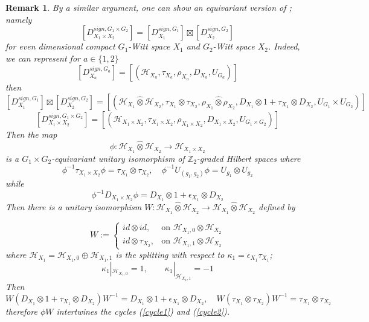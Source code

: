 \documentclass[11pt,leqno,twoside]{amsart}
\theoremstyle{plainsl}
\newtheorem{remark}[theorem]{Remark}
\theoremstyle{definition}
\begin{document}
\begin{remark}\label{anotherproofofcaretstionKhomology}
By a similar argument, one can show an equivariant version of \cite[Corollary 5.18]{ABP1}; namely
\begin{equation}\label{equivaintabp1result}
    [D^{sign, G_1\times G_2}_{X_1\times X_2}]=[D^{sign, G_1}_{X_1}] \boxtimes [D^{sign, G_2}_{X_2}]
\end{equation}
for even dimensional compact $G_1$-Witt space $X_1$ and $G_2$-Witt space $X_2$.  Indeed, we can represent for $a\in \{1,2\}$
\[[D^{sign, G_a}_{X_a}]=\left[(\mathcal{H}_{X_a},\tau_{X_a},\rho_{X_a},D_{X_a},{U}_{G_a})\right]\]
then
\begin{equation}\label{cycle1}
   [D^{sign, G_1}_{X_1}] \boxtimes [D^{sign, G_2}_{X_2}]=\left[(\mathcal{H}_{X_1}\widehat{\otimes} \mathcal{H}_{X_2},\tau_{X_1}\otimes \tau_{X_2},\rho_{X_1} \widehat{\otimes}\rho_{X_2},D_{X_1}\otimes 1+ \tau_{X_1}\otimes D_{X_2} ,{U}_{G_1}\times {U}_{G_2})\right] 
\end{equation}
\begin{equation}\label{cycle2}
    [D^{sign, G_1\times G_2}_{X_1\times X_2}]=\left[(\mathcal{H}_{X_1\times X_2},\tau_{X_1\times X_2},\rho_{X_1\times X_2},D_{X_1\times X_2},  {U}_{G_1\times G_2})    \right]
\end{equation}
Then the map 
\[\phi:\mathcal{H}_{X_1}\widehat{\otimes} \mathcal{H}_{X_2} \rightarrow \mathcal{H}_{X_1\times X_2}\]
is a $G_1\times G_2$-\textit{equivariant} unitary isomorphism of  \(\mathbb Z_2\)-graded Hilbert spaces where
\[
\phi^{-1}\tau_{X_1\times X_2}\phi=\tau_{X_1}\otimes\tau_{X_2}, \quad 
\phi^{-1}U_{(g_1,g_2)}\phi=U_{g_1}\otimes U_{g_2}
\]
while
\[\phi^{-1}D_{X_1\times X_2}\phi=D_{X_1}\otimes1+\epsilon_{X_1}\otimes D_{X_2}\]
Then  there is a unitary isomorphism  $W:\mathcal{H}_{X_1}\widehat{\otimes} \mathcal{H}_{X_2} \rightarrow \mathcal{H}_{X_1}\widehat{\otimes} \mathcal{H}_{X_2}$ defined by



\[
W:=
\begin{cases}
id\otimes id,&\text{on }\mathcal H_{X_1,0}\otimes\mathcal H_{X_2}\\
id\otimes\tau_{X_2},&\text{on }\mathcal H_{X_1,1}\otimes\mathcal H_{X_2}
\end{cases}
\]
where $\mathcal H_{X_1}=\mathcal H_{X_1,0}\oplus\mathcal H_{X_1,1}$ is the splitting with respect to $\kappa_1=\epsilon_{X_1}\tau_{X_1}$; $$\kappa_1|_{\mathcal H_{X_1,0}}=1, \qquad
\kappa_1|_{\mathcal H_{X_1,1}}=-1$$ Then
\[W(D_{X_1}\otimes 1+ \tau_{X_1}\otimes D_{X_2})W^{-1}=D_{X_1}\otimes1+\epsilon_{X_1}\otimes D_{X_2},\quad W(\tau_{X_1}\otimes \tau_{X_2})W^{-1}=\tau_{X_1}\otimes \tau_{X_2}\]
therefore $\phi W$ intertwines the cycles (\ref{cycle1}) and (\ref{cycle2}).
\end{remark}
\end{document}
